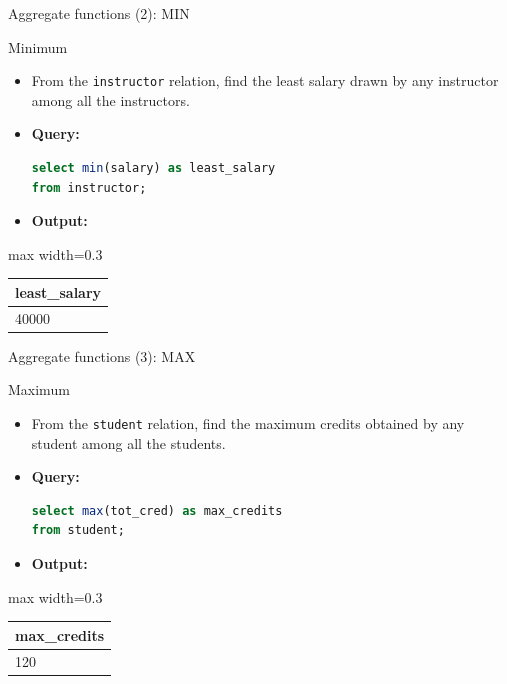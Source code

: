 \documentclass[aspectratio=169, xcolor=dvipsnames]{beamer}
\begin{document}
\begin{frame}[fragile]{Aggregate functions (2): MIN}
    \begin{block}{Minimum}
        \begin{itemize}[<+->]
            \item From the \texttt{instructor} relation, find the least salary drawn by any instructor among all the instructors.
            \item \textbf{Query:}
            \begin{lstlisting}[language=SQL]
select min(salary) as least_salary 
from instructor;
            \end{lstlisting}
            \item \textbf{Output:}
        \end{itemize}
    \end{block}
    \begin{center}
        \begin{adjustbox}{max width=0.3\textwidth}
        \begin{tabular}{|l|}
        \hline
        \textbf{least\_salary} \\ \hline
        40000 \\ \hline
        \end{tabular}
        \end{adjustbox}
    \end{center}
\end{frame}

\begin{frame}[fragile]{Aggregate functions (3): MAX}
    \begin{block}{Maximum}
        \begin{itemize}[<+->]
            \item From the \texttt{student} relation, find the maximum credits obtained by any student among all the students.
            \item \textbf{Query:}
            \begin{lstlisting}[language=SQL]
select max(tot_cred) as max_credits 
from student;
            \end{lstlisting}
            \item \textbf{Output:}
        \end{itemize}
    \end{block}
    \begin{center}
        \begin{adjustbox}{max width=0.3\textwidth}
        \begin{tabular}{|l|}
        \hline
        \textbf{max\_credits} \\ \hline
        120 \\ \hline
        \end{tabular}
        \end{adjustbox}
    \end{center}
\end{frame}
\end{document}
